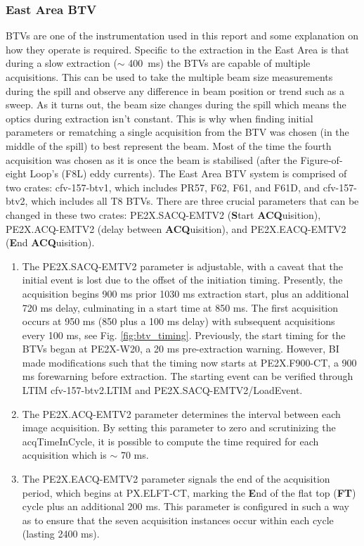 \subsubsection{East Area BTV}
BTVs are one of the instrumentation used in this report and some explanation on how they operate is required. Specific to the extraction in the East Area is that during a slow extraction ($\sim$ \SI{400}{ms}) the BTVs are capable of multiple acquisitions. This can be used to take the multiple beam size measurements during the spill and observe any difference in beam position or trend such as a sweep. As it turns out, the beam size changes during the spill which means the optics during extraction isn't constant. This is why when finding initial parameters or rematching a single acquisition from the BTV was chosen (in the middle of the spill) to best represent the beam. Most of the time the fourth acquisition was chosen as it is once the beam is stabilised (after the Figure-of-eight Loop's (F8L) eddy currents). The East Area BTV system is comprised of two crates: cfv-157-btv1, which includes PR57, F62, F61, and F61D, and cfv-157-btv2, which includes all T8 BTVs. There are three crucial parameters that can be changed in these two crates: PE2X.SACQ-EMTV2 (\textbf{S}tart \textbf{ACQ}uisition), PE2X.ACQ-EMTV2 (delay between \textbf{ACQ}uisition), and PE2X.EACQ-EMTV2 (\textbf{E}nd \textbf{ACQ}uisition).

\begin{enumerate}
    \item The PE2X.SACQ-EMTV2 parameter is adjustable, with a caveat that the initial event is lost due to the offset of the initiation timing. Presently, the acquisition begins 900 ms prior 1030 ms extraction start, plus an additional 720 ms delay, culminating in a start time at 850 ms. The first acquisition occurs at 950 ms (850 plus a 100 ms delay) with subsequent acquisitions every 100 ms, see Fig. \ref{fig:btv_timing}. Previously, the start timing for the BTVs began at PE2X-W20, a 20 ms pre-extraction warning. However, BI made modifications such that the timing now starts at PE2X.F900-CT, a 900 ms forewarning before extraction. The starting event can be verified through LTIM cfv-157-btv2.LTIM and PE2X.SACQ-EMTV2/LoadEvent.
    \item The PE2X.ACQ-EMTV2 parameter determines the interval between each image acquisition. By setting this parameter to zero and scrutinizing the acqTimeInCycle, it is possible to compute the time required for each acquisition which is $\sim$ 70 ms.
    \item The PE2X.EACQ-EMTV2 parameter signals the end of the acquisition period, which begins at PX.ELFT-CT, marking the \textbf{E}nd of the flat top (\textbf{FT}) cycle plus an additional 200 ms. This parameter is configured in such a way as to ensure that the seven acquisition instances occur within each cycle (lasting 2400 ms).
\end{enumerate}

